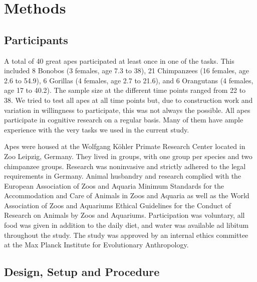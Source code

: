 \documentclass[10pt, letterpaper]{article}
\begin{document}
\hypertarget{methods}{%
\section{Methods}\label{methods}}

\hypertarget{participants}{%
\subsection{Participants}\label{participants}}

A total of 40 great apes participated at least once in one of the tasks.
This included 8 Bonobos (3 females, age 7.3 to 38), 21 Chimpanzees (16
females, age 2.6 to 54.9), 6 Gorillas (4 females, age 2.7 to 21.6), and
6 Orangutans (4 females, age 17 to 40.2). The sample size at the
different time points ranged from 22 to 38. We tried to test all apes at
all time points but, due to construction work and variation in
willingness to participate, this was not always the possible. All apes
participate in cognitive research on a regular basis. Many of them have
ample experience with the very tasks we used in the current study.

Apes were housed at the Wolfgang Köhler Primate Research Center located
in Zoo Leipzig, Germany. They lived in groups, with one group per
species and two chimpanzee groups. Research was noninvasive and strictly
adhered to the legal requirements in Germany. Animal husbandry and
research complied with the European Association of Zoos and Aquaria
Minimum Standards for the Accommodation and Care of Animals in Zoos and
Aquaria as well as the World Association of Zoos and Aquariums Ethical
Guidelines for the Conduct of Research on Animals by Zoos and Aquariums.
Participation was voluntary, all food was given in addition to the daily
diet, and water was available ad libitum throughout the study. The study
was approved by an internal ethics committee at the Max Planck Institute
for Evolutionary Anthropology.

\hypertarget{design-setup-and-procedure}{%
\subsection{Design, Setup and
Procedure}\label{design-setup-and-procedure}}
\end{document}
